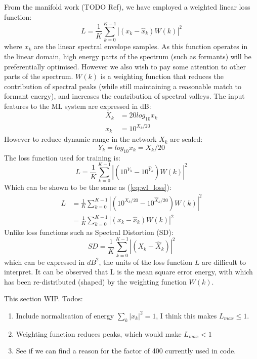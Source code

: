\documentclass{article}
\begin{document}
From the manifold work (TODO Ref), we have employed a weighted linear loss function:
\begin{equation}
\label{eq:wl_loss}
L = \frac{1}{K}\sum_{k=0}^{K-1}|(x_k-\hat{x}_k)W(k)|^2
\end{equation}
where $x_k$ are the linear spectral envelope samples. As this function operates in the linear domain, high energy parts of the spectrum (such as formants) will be preferentially optimised. However we also wish to pay some attention to other parts of the spectrum. $W(k)$ is a weighting function that reduces the contribution of spectral peaks (while still maintaining a reasonable match to formant energy), and increases the contribution of spectral valleys.
The input features to the ML system are expressed in dB:
\begin{equation}
\begin{split}
X_k &= 20log_{10}x_k \\
x_k &= 10^{X_k/20}
\end{split}
\end{equation}
However to reduce dynamic range in the network $X_k$ are scaled:
\begin{equation}
Y_k = log_{10}x_k = X_k/20
\end{equation}
The loss function used for training is:
\begin{equation}
L = \frac{1}{K}\sum_{k=0}^{K-1} | ( 10^{Y_k} - 10^{\hat{Y}_k} )W(k)|^2
\end{equation}
Which can be shown to be the same as (\ref{eq:wl_loss}):
\begin{equation}
\begin{split}
L &= \frac{1}{K}\sum_{k=0}^{K-1}|(10^{X_k/20} - 10^{\hat{X}_k/20})W(k)|^2 \\
  &= \frac{1}{K}\sum_{k=0}^{K-1}|(x_k - \hat{x}_k)W(k)|^2
\end{split}
\end{equation}
Unlike loss functions such as Spectral Distortion (SD):
\begin{equation}
\label{eq:sd_loss}
SD = \frac{1}{K}\sum_{k=0}^{K-1}|(X_k - \hat{X}_k)|^2
\end{equation}
which can be expressed in $dB^2$, the units of the loss function $L$ are difficult to interpret.  It can be observed that L is the mean square error energy, with which has been re-distributed (shaped) by the weighting function $W(k)$. 

This section WIP. Todos:
\begin{enumerate}
\item Include normalisation of energy $\sum_k |x_k|^2 = 1$, I think this makes $L_{max} \le 1$.
\item Weighting function reduces peaks, which would make $L_{max}<1$
\item See if we can find a reason for the factor of 400 currently used in code.
\end{enumerate}
\end{document}
